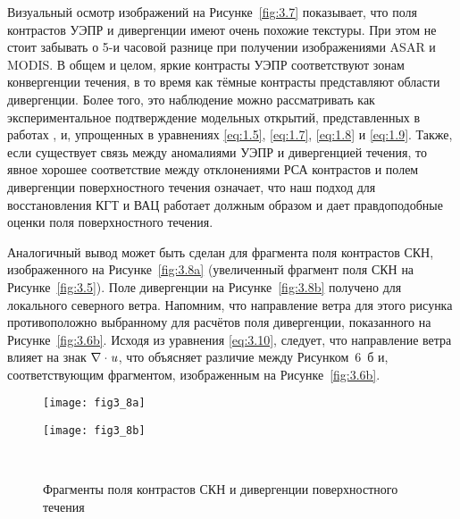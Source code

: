 Визуальный осмотр изображений на Рисунке~\ref{fig:3.7} показывает, что поля контрастов УЭПР и дивергенции имеют очень похожие текстуры. При этом не стоит забывать о 5-и часовой разнице при получении изображениями ASAR и MODIS. В общем и целом, яркие контрасты УЭПР соответствуют зонам конвергенции течения, в то время как тёмные контрасты представляют области дивергенции. Более того, это наблюдение можно рассматривать как экспериментальное подтверждение модельных открытий, представленных в работах \citep{Kudryavtsev2005,Johannessen2005}, и, упрощенных в уравнениях \eqref{eq:1.5}, \eqref{eq:1.7}, \eqref{eq:1.8} и \eqref{eq:1.9}. Также, если существует связь между аномалиями УЭПР и дивергенцией течения, то явное хорошее соответствие между отклонениями РСА контрастов и полем дивергенции поверхностного течения означает, что наш подход для восстановления КГТ и ВАЦ работает должным образом и дает правдоподобные оценки поля поверхностного течения.

Аналогичный вывод может быть сделан для фрагмента поля контрастов СКН, изображенного на Рисунке~\ref{fig:3.8a} (увеличенный фрагмент поля СКН на Рисунке~\ref{fig:3.5}). Поле дивергенции на Рисунке~\ref{fig:3.8b} получено для локального северного ветра. Напомним, что направление ветра для этого рисунка противоположно выбранному для расчётов поля дивергенции, показанного на Рисунке~\ref{fig:3.6b}. Исходя из уравнения \eqref{eq:3.10}, следует, что направление ветра влияет на знак $\nabla \cdot {\it u}$, что объясняет различие между Рисунком~6~б и, соответствующим фрагментом, изображенным на Рисунке~\ref{fig:3.6b}.



\begin{figure}[H]
   	\centering
	\begin{minipage}{.47\textwidth}
	    \subcaptionbox{\label{fig:3.8a}}
		{\texttt{[image: fig3\_8a]}}
	\end{minipage}
	\hfill
	\begin{minipage}{.47\textwidth}
	    \subcaptionbox{\label{fig:3.8b}}
		{\texttt{[image: fig3\_8b]}}
	\end{minipage}
    \\
    \caption{Фрагменты поля контрастов СКН и дивергенции поверхностного течения}
    \label{fig:3.8}
\end{figure}


